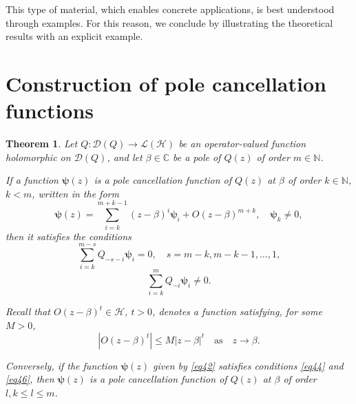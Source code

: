 \documentclass[11pt, reqno]{amsart}
\theoremstyle{plain}
\newtheorem{thm}{Theorem}[section]
\theoremstyle{remark}
\newcounter{str}
\numberwithin{equation}{section}
\begin{document}
This type of material, which enables concrete applications, is best understood through examples. For this reason, we conclude by illustrating the theoretical results with an explicit example.
\section{Construction of pole cancellation functions}\label{s4} 
\begin{thm}\label{theorem42}
Let $Q : \mathcal{D}(Q) \rightarrow \mathcal{L}(\mathcal{H})$ be an operator-valued function holomorphic on $\mathcal{D}(Q)$, and let $\beta \in \mathbb{C}$ be a pole of $Q(z)$ of order $m \in \mathbb{N}$.

If a function $\boldsymbol{\psi}(z)$ is a pole cancellation function of $Q(z)$ at $\beta$ of order $k \in \mathbb{N}$, $k < m$, written in the form 
\begin{equation}\label{eq42}
\boldsymbol{\psi}(z) = \sum_{i=k}^{m+k-1} (z - \beta)^{i} \boldsymbol{\psi}_{i} +  O(z - \beta)^{m+k}, \quad \boldsymbol{\psi}_{k}\neq 0, 
\end{equation}
then it satisfies the conditions
\begin{equation}\label{eq44}
\sum_{i=k}^{m-s} Q_{-s-i} \boldsymbol{\psi}_{i} = 0, \quad s = m-k, m-k-1, \dots, 1,
\end{equation}
\begin{equation}\label{eq46}
\sum_{i=k}^{m} Q_{-i} \boldsymbol{\psi}_{i} \neq 0.
\end{equation}

Recall that $O(z - \beta)^{t} \in \mathcal{H}$, $t>0$, denotes a function satisfying, for some $M>0$,
\[
|O(z - \beta)^{t}| \leq M |z - \beta|^{t} \quad \text{as} \quad z \to \beta.
\]

Conversely, if the function $\boldsymbol{\psi}(z)$ given by \eqref{eq42} satisfies conditions \eqref{eq44} and \eqref{eq46}, then $\boldsymbol{\psi}(z)$ is a pole cancellation function of $Q(z)$ at $\beta$ of order $l, k\le l \le m$.
\end{thm}
\end{document}
